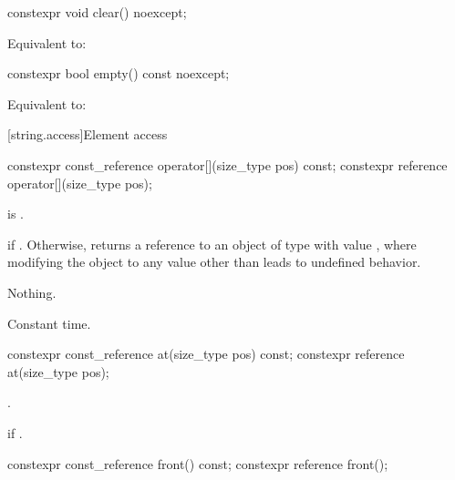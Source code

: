%
\begin{itemdecl}
constexpr void clear() noexcept;
\end{itemdecl}

\begin{itemdescr}
\pnum
\effects
Equivalent to: 
\end{itemdescr}

%
\begin{itemdecl}
constexpr bool empty() const noexcept;
\end{itemdecl}

\begin{itemdescr}
\pnum
\effects
Equivalent to:
\end{itemdescr}

[string.access]{Element access}

%
\begin{itemdecl}
constexpr const_reference operator[](size_type pos) const;
constexpr reference       operator[](size_type pos);
\end{itemdecl}

\begin{itemdescr}
\pnum
\hardexpects
{} is .

\pnum
\returns
{} if . Otherwise,
returns a reference to an object of type  with value
, where modifying the object to any value other than
 leads to undefined behavior.

\pnum
\throws
Nothing.

\pnum
\complexity
Constant time.
\end{itemdescr}

%
\begin{itemdecl}
constexpr const_reference at(size_type pos) const;
constexpr reference       at(size_type pos);
\end{itemdecl}

\begin{itemdescr}
\pnum
\returns
{}.

\pnum
\throws
{}
if
.
\end{itemdescr}

%
\begin{itemdecl}
constexpr const_reference front() const;
constexpr reference front();
\end{itemdecl}

